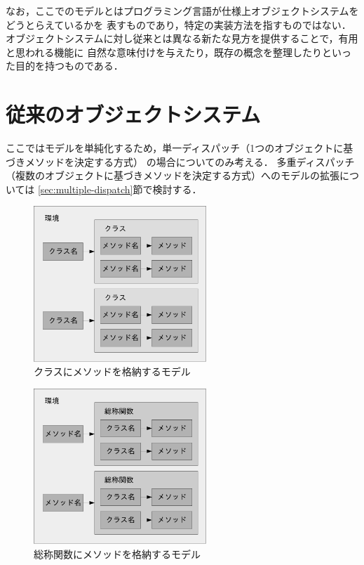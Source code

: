 \documentclass{ipsjprosym}
\begin{document}
なお，ここでのモデルとはプログラミング言語が仕様上オブジェクトシステムをどうとらえているかを
表すものであり，特定の実装方法を指すものではない．
オブジェクトシステムに対し従来とは異なる新たな見方を提供することで，有用と思われる機能に
自然な意味付けを与えたり，既存の概念を整理したりといった目的を持つものである．

\section{従来のオブジェクトシステム}

ここではモデルを単純化するため，単一ディスパッチ（1つのオブジェクトに基づきメソッドを決定する方式）
の場合についてのみ考える．
多重ディスパッチ（複数のオブジェクトに基づきメソッドを決定する方式）へのモデルの拡張については
\ref{sec:multiple-dispatch}節で検討する．

\begin{figure}
\centering
\includegraphics[width=6.5cm]{fig/classes-crop.pdf}
\caption{クラスにメソッドを格納するモデル}
\label{fig:classes}
\end{figure}

\begin{figure}
\centering
\includegraphics[width=6.5cm]{fig/generic-functions-crop.pdf}
\caption{総称関数にメソッドを格納するモデル}
\label{fig:generic-functions}
\end{figure}
\end{document}
